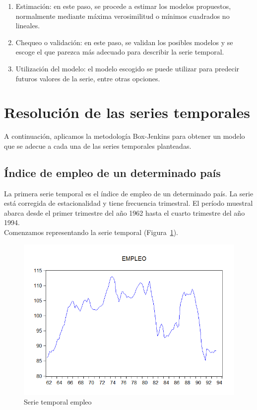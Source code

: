 \documentclass[12pt,a4paper,twoside,openright,titlepage,final]{article}
\begin{document}
\begin{enumerate}
	\item Estimación: en este paso, se procede a estimar los modelos propuestos, normalmente mediante máxima verosimilitud o mínimos cuadrados no lineales. 
	
	\item Chequeo o validación: en este paso, se validan los posibles modelos y se escoge el que parezca más adecuado para describir la serie temporal.
	
	\item Utilización del modelo: el modelo escogido se puede utilizar para predecir futuros valores de la serie, entre otras opciones.
\end{enumerate}

\section{Resolución de las series temporales}

A continuación, aplicamos la metodología Box-Jenkins para obtener un modelo que se adecue a cada una de las series temporales planteadas. 

\subsection{Índice de empleo de un determinado país}

La primera serie temporal es el índice de empleo de un determinado país. La serie está corregida de estacionalidad y tiene frecuencia trimestral. El período muestral abarca desde el primer trimestre del año 1962 hasta el cuarto trimestre del año 1994.\\

Comenzamos representando la serie temporal (Figura~\ref{fig:empleo}).

\begin{figure}[tbph!]
\centering
\includegraphics[width=0.8\linewidth]{imagenes/empleo/empleo.png}
\caption{Serie temporal empleo}
\label{fig:empleo}
\end{figure}
\end{document}
